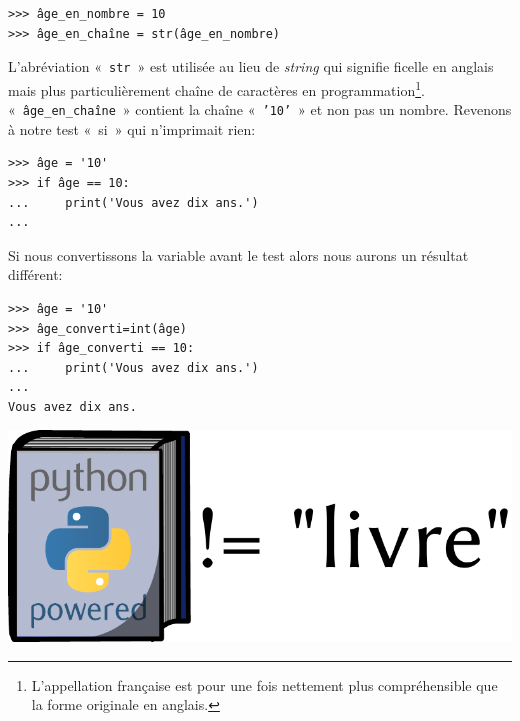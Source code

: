 \begin{Verbatim}[frame=single,rulecolor=\color{mbleu}, label=à taper]
>>> âge_en_nombre = 10
>>> âge_en_chaîne = str(âge_en_nombre)
\end{Verbatim}

L'abréviation « \texttt{str} » est utilisée au lieu de \emph{string} qui signifie ficelle en anglais mais plus particulièrement chaîne de caractères en programmation\footnote{L'appellation française est pour une fois nettement plus compréhensible que la forme originale en anglais.}.\\

« \texttt{âge\_en\_chaîne} » contient la chaîne « \texttt{'10'} » et non pas un nombre. Revenons à notre test « si » qui n'imprimait rien:

\begin{Verbatim}[frame=single,rulecolor=\color{green}, label=à taper avec attention]
>>> âge = '10'
>>> if âge == 10:
...     print('Vous avez dix ans.')
...
\end{Verbatim}

Si nous convertissons la variable avant le test alors nous aurons un résultat différent:

\begin{Verbatim}[frame=single,rulecolor=\color{green}, label=à taper avec attention]
>>> âge = '10'
>>> âge_converti=int(âge)
>>> if âge_converti == 10:
...     print('Vous avez dix ans.')
...
Vous avez dix ans.
\end{Verbatim}

\vfill
\begin{center}
\includegraphics[scale=1]{images/livre.pdf} 
\end{center}
\vfill

\clearemptydoublepage
